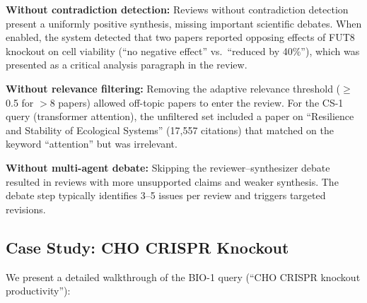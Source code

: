 \documentclass[11pt]{article}
\begin{document}
\textbf{Without contradiction detection:} Reviews without contradiction detection present a uniformly positive synthesis, missing important scientific debates. When enabled, the system detected that two papers reported opposing effects of FUT8 knockout on cell viability (``no negative effect'' vs.\ ``reduced by 40\%''), which was presented as a critical analysis paragraph in the review.

\textbf{Without relevance filtering:} Removing the adaptive relevance threshold ($\geq$0.5 for $>$8 papers) allowed off-topic papers to enter the review. For the CS-1 query (transformer attention), the unfiltered set included a paper on ``Resilience and Stability of Ecological Systems'' (17,557 citations) that matched on the keyword ``attention'' but was irrelevant.

\textbf{Without multi-agent debate:} Skipping the reviewer--synthesizer debate resulted in reviews with more unsupported claims and weaker synthesis. The debate step typically identifies 3--5 issues per review and triggers targeted revisions.

\subsection{Case Study: CHO CRISPR Knockout}

We present a detailed walkthrough of the BIO-1 query (``CHO CRISPR knockout productivity''):
\end{document}

